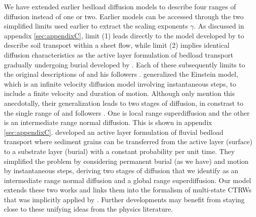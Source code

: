 \documentclass[]{agujournal2018}
\begin{document}
We have extended earlier bedload diffusion models to describe four ranges of diffusion instead of one or two.
Earlier models can be accessed through the two simplified limits used earlier to extract the scaling exponents $\gamma$.
As discussed in appendix \ref{sec:appendixC}, limit (1) leads directly to the model developed by \citet{Lisle1998} to describe soil transport within a sheet flow, while limit (2) implies identical diffusion characteristics as the active layer formulation of bedload transport gradually undergoing burial developed by \citet{Wu2019}.
Each of these subsequently limits to the original descriptions of \citet{Einstein1937} and his followers \citep[e.g.][]{Hubbell1964, Nakagawa1976, Yano1969,Shen1980}.
\citet{Lisle1998} generalized the Einstein model, which is an infinite velocity diffusion model involving instantaneous steps, to include a finite velocity and duration of motion.
Although \citet{Lisle1998} only mention this anecdotally, their generalization leads to two stages of diffusion, in constrast to the single range of \citet{Einstein1937} and followers \citep[e.g.][]{Yano1969, Nakagawa1976}.
One is local range superdiffusion and the other is an intermediate range normal diffusion.
This is shown in appendix \ref{sec:appendixC}.
\citet{Wu2019} developed an active layer formulation of fluvial bedload transport where sediment grains can be transferred from the active layer (surface) to a substrate layer (burial) with a constant probability per unit time.
They simplified the problem by considering permanent burial (as we have) and motion by instantaneous steps, deriving two stages of diffusion that we identify as an intermediate range normal diffusion and a global range superdiffusion.
Our model extends these two works and links them into the formalism of multi-state CTRWs \citep[e.g.][]{Weiss1994} that was implicitly applied by \citet{Einstein1937}. Further developments may benefit from staying close to these unifying ideas from the physics literature.
\end{document}
